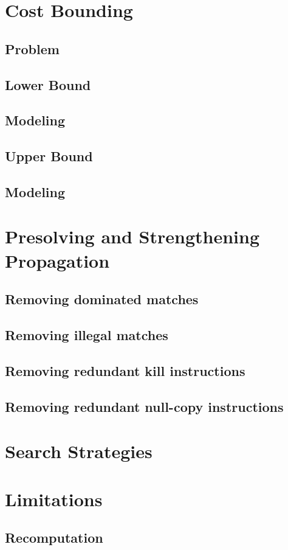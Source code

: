 \documentclass{kthdiss}
\begin{document}
\chapter{Cost Bounding}
\section{Problem}
\section{Lower Bound}
\section{Modeling}
\section{Upper Bound}
\section{Modeling}

\chapter{Presolving and Strengthening Propagation}
\section{Removing dominated matches}
\section{Removing illegal matches}
\section{Removing redundant kill instructions}
\section{Removing redundant null-copy instructions}

\chapter{Search Strategies}

\chapter{Limitations}
\section{Recomputation}
\end{document}
